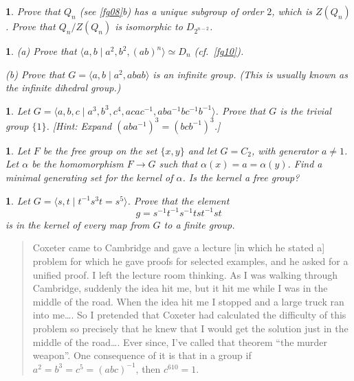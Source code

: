 \documentclass[a4paper,11pt,final,openany]{memoir}%
\newtheorem{exercise}[Y]{}
\theoremstyle{nonumberplain}
\begin{document}
\begin{exercise}
\label{x8} Prove that $Q_{n}$ (see \ref{fg08}b) has a unique subgroup of order
$2$, which is $Z(Q_{n})$. Prove that $Q_{n}/Z(Q_{n})$ is isomorphic to
$D_{2^{n-2}}$.
\end{exercise}

\begin{exercise}
\label{x9} (a) Prove that $\langle a,b\mid a^{2},b^{2},(ab)^{n}\rangle\simeq
D_{n}$ (cf.\ \ref{fg10}).

\noindent(b) Prove that $G=\langle a,b\mid a^{2},abab\rangle$ is an infinite
group. (This is usually known as the infinite dihedral group.)
\end{exercise}

\begin{exercise}
\label{x10} Let $G=\langle a,b,c\mid a^{3},b^{3},c^{4},acac^{-1}%
,aba^{-1}bc^{-1}b^{-1}\rangle$. Prove that $G$ is the trivial group $\{1\}$.
[Hint: Expand $(aba^{-1})^{3}=(bcb^{-1})^{3}$.]
\end{exercise}

\begin{exercise}
\label{x11} Let $F$ be the free group on the set $\{x,y\}$ and let $G=C_{2}$,
with generator $a\neq1$. Let $\alpha$ be the homomorphism $F\rightarrow G$
such that $\alpha(x)=a=\alpha(y)$. Find a minimal generating set for the
kernel of $\alpha$. Is the kernel a free group?
\end{exercise}

\begin{exercise}
\label{x12} Let $G=\langle s,t\mid t^{-1}s^{3}t=s^{5}\rangle$. Prove that the
element
\[
g=s^{-1}t^{-1}s^{-1}tst^{-1}st
\]
is in the kernel of every map from $G$ to a finite group.
\end{exercise}

\medskip

\begin{quote}
{\footnotesize Coxeter came to Cambridge and gave a lecture [in which he
stated a] problem for which he gave proofs for selected examples, and he asked
for a unified proof. I left the lecture room thinking. As I was walking
through Cambridge, suddenly the idea hit me, but it hit me while I was in the
middle of the road. When the idea hit me I stopped and a large truck ran into
me\ldots. So I pretended that Coxeter had calculated the difficulty of this
problem so precisely that he knew that I would get the solution just in the
middle of the road\ldots. Ever since, I've called that theorem
\textquotedblleft the murder weapon\textquotedblright. One consequence of it
is that in a group if $a^{2}=b^{3}=c^{5}=(abc)^{-1}$, then $c^{610}=1$. }
\end{quote}
\end{document}
